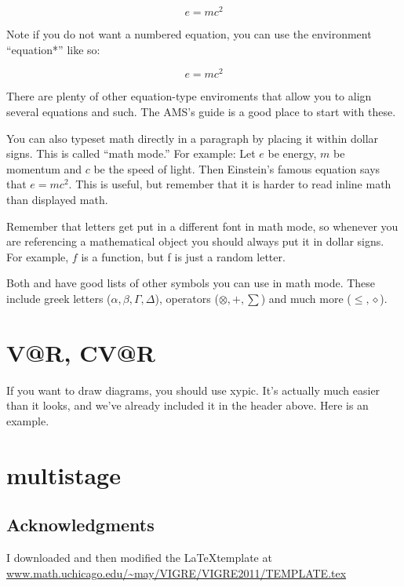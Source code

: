 \documentclass{amsart}
\theoremstyle{definition}
\theoremstyle{remark}
\begin{document}
\begin{equation}  e = mc^2
\end{equation}

Note if you do not want a numbered equation, you can use the
environment ``equation*''
 like so:

\begin{equation*}
e=mc^2
\end{equation*}

There are plenty of other equation-type enviroments that allow you to
align several equations and such. The AMS's guide is a
good place to start with these.

You can also typeset math directly in a paragraph by placing it within
dollar signs.  This is called ``math mode.''  For example: Let $e$
be energy, $m$ be momentum and $c$ be the speed of light.  Then
Einstein's famous equation says that $e=mc^2$.  This is useful, but
remember that it is harder to read inline math than displayed math. 

Remember that letters get put in a different font in math mode, so
whenever you are referencing a mathematical object you should always
put it in dollar signs.  For example, $f$ is a function, but f is just
a random letter.

Both and  have good lists of other symbols you can use in math mode.
These include greek letters ($\alpha, \beta, \Gamma, \Delta$),
operators ($\otimes, +, \sum$) and much more ($\leq, \diamond$).


\section{V@R, CV@R}

If you want to draw diagrams, you should use xypic.  It's actually
much easier than it looks, and we've already included it in the header
above.  Here is an example. 

\section{multistage}

\subsection*{Acknowledgments}  I downloaded and then modified the \LaTeX template at \url{www.math.uchicago.edu/~may/VIGRE/VIGRE2011/TEMPLATE.tex}



\end{document}
